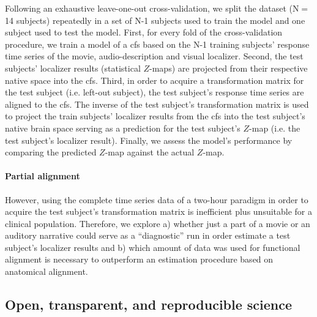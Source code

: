 %
Following an exhaustive leave-one-out cross-validation, we split the dataset
(N$=$14 subjects) repeatedly in a set of N-1 subjects used to train the model
and one subject used to test the model.
%
First, for every fold of the cross-validation procedure, we train a model of a
\ac{cfs} based on the N-1 training subjects' response time series of the movie,
audio-description and visual localizer.
%
Second, the test subjects' localizer results (statistical $Z$-maps) are
projected from their respective native space into the \ac{cfs}.
%
Third, in order to acquire a transformation matrix for the test subject (i.e.
left-out subject), the test subject's response time series are aligned to the
\ac{cfs}.
%
The inverse of the test subject's transformation matrix is used to project the
train subjects' localizer results from the \ac{cfs} into the test subject's
native brain space serving as a prediction for the test subject's $Z$-map (i.e.
the test subject's localizer result).
%
Finally, we assess the model's performance by comparing the predicted $Z$-map
against the actual $Z$-map.


\paragraph{Partial alignment}
However, using the complete time series data of a two-hour paradigm in order to
acquire the test subject's transformation matrix is inefficient plus unsuitable
for a clinical population.
%
Therefore, we explore a) whether just a part of a movie or an auditory narrative
could serve as a ``diagnostic'' run in order estimate a test
subject's localizer results and b)  which amount of data was used for functional
alignment is necessary to outperform an estimation procedure based on anatomical
alignment.


\subsection{Open, transparent, and reproducible science}

